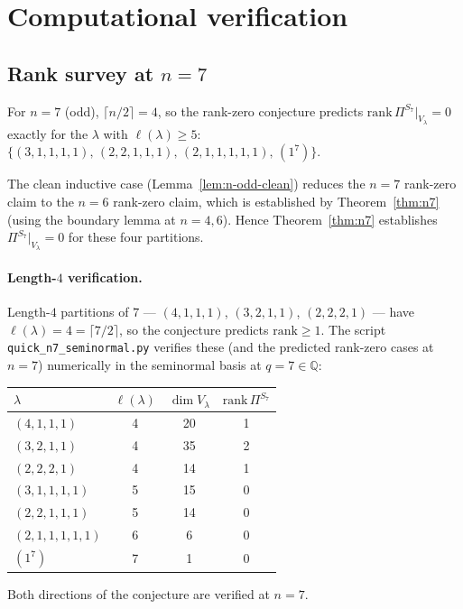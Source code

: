 \documentclass[11pt]{article}
\theoremstyle{definition}
\begin{document}
\section{Computational verification}\label{sec:verify}

\subsection{Rank survey at $n=7$}

For $n=7$ (odd), $\lceil n/2\rceil=4$, so the rank-zero conjecture
predicts $\mathrm{rank}\,\Pi^{S_7}|_{V_\lambda}=0$ exactly for the
$\lambda$ with $\ell(\lambda)\ge 5$:
$\{(3,1,1,1,1),\,(2,2,1,1,1),\,(2,1,1,1,1,1),\,(1^7)\}$.

The clean inductive case (Lemma~\ref{lem:n-odd-clean}) reduces the
$n=7$ rank-zero claim to the $n=6$ rank-zero claim, which is
established by Theorem~\ref{thm:n7} (using the boundary lemma at
$n=4,6$). Hence Theorem~\ref{thm:n7} establishes
$\Pi^{S_7}|_{V_\lambda}=0$ for these four partitions.

\paragraph{Length-$4$ verification.}
Length-$4$ partitions of $7$ ---
$(4,1,1,1)$, $(3,2,1,1)$, $(2,2,2,1)$ --- have $\ell(\lambda)=4
=\lceil 7/2\rceil$, so the conjecture predicts $\mathrm{rank}\ge 1$.
The script \texttt{quick\_n7\_seminormal.py} verifies these (and the
predicted rank-zero cases at $n=7$) numerically in the seminormal
basis at $q=7\in\mathbb{Q}$:
\begin{center}
\begin{tabular}{l c c c}
\toprule
$\lambda$ & $\ell(\lambda)$ & $\dim V_\lambda$ & $\mathrm{rank}\,\Pi^{S_7}$ \\
\midrule
$(4,1,1,1)$       & 4 & 20 & 1 \\
$(3,2,1,1)$       & 4 & 35 & 2 \\
$(2,2,2,1)$       & 4 & 14 & 1 \\
$(3,1,1,1,1)$     & 5 & 15 & 0 \\
$(2,2,1,1,1)$     & 5 & 14 & 0 \\
$(2,1,1,1,1,1)$   & 6 & 6  & 0 \\
$(1^7)$           & 7 & 1  & 0 \\
\bottomrule
\end{tabular}
\end{center}
Both directions of the conjecture are verified at $n=7$.
\end{document}
